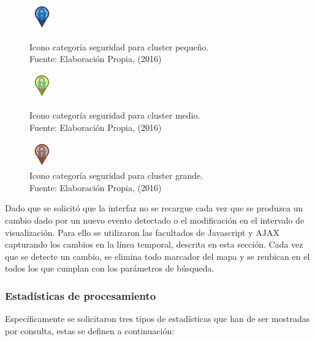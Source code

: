 \begin{figure}[H]
	\centering
	\captionsetup{justification=centering}
	\includegraphics[scale=1]{images/categorias/seguridadS.png}
	\caption[Icono categoría seguridad para cluster pequeño.]{Icono categoría seguridad para cluster pequeño.\\Fuente: Elaboración Propia, (2016)}
	\label{fig:seguridadS}
	\endminipage\hfill
	\centering
	\captionsetup{justification=centering}
	\includegraphics[scale=1]{images/categorias/seguridadM.png}
	\caption[Icono categoría seguridad para cluster medio.]{Icono categoría seguridad para cluster medio.\\Fuente: Elaboración Propia, (2016)}
	\label{fig:seguridadM}
	\endminipage\hfill
	\centering
	\captionsetup{justification=centering}
	\includegraphics[scale=1]{images/categorias/seguridadL.png}
	\caption[Icono categoría seguridad para cluster grande.]{Icono categoría seguridad para cluster grande.\\Fuente: Elaboración Propia, (2016)}
	\label{fig:seguridadL}
	\endminipage\hfill
\end{figure}

Dado que se solicitó que la interfaz no se recargue cada vez que se produzca un cambio dado por un nuevo evento detectado o el modificación en el intervalo de visualización. Para ello se utilizaron las facultados de Javascript y AJAX capturando los cambios en la línea temporal, descrita en esta sección. Cada vez que se detecte un cambio, se elimina todo marcador del mapa y se reubican en el todos los que cumplan con los parámetros de búsqueda.

\subsubsection*{Estadísticas de procesamiento}
\label{subsubsec:estadisticasdeproc}

Específicamente se solicitaron tres tipos de estadísticas que han de ser mostradas por consulta, estas se definen a continuación:

